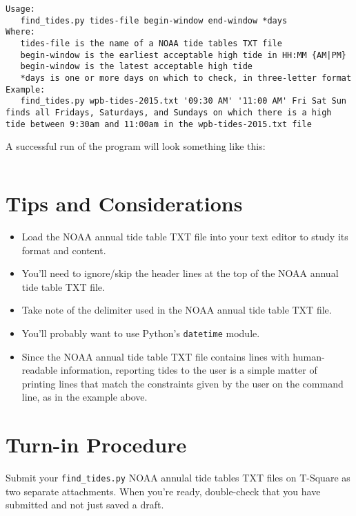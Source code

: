 \documentclass[12pt]{article}
\begin{document}
\begin{lstlisting}
Usage:
   find_tides.py tides-file begin-window end-window *days
Where:
   tides-file is the name of a NOAA tide tables TXT file
   begin-window is the earliest acceptable high tide in HH:MM {AM|PM}
   begin-window is the latest acceptable high tide
   *days is one or more days on which to check, in three-letter format
Example:
   find_tides.py wpb-tides-2015.txt '09:30 AM' '11:00 AM' Fri Sat Sun
finds all Fridays, Saturdays, and Sundays on which there is a high
tide between 9:30am and 11:00am in the wpb-tides-2015.txt file
\end{lstlisting}

A successful run of the program will look something like this:

\begin{lstlisting}

\end{lstlisting}


\section{Tips and Considerations}

\begin{itemize}
  \itemsep0em
  \item Load the NOAA annual tide table TXT file into your text editor to study its format and content.
\item You'll need to ignore/skip the header lines at the top of the NOAA annual tide table TXT file.
\item Take note of the delimiter used in the NOAA annual tide table TXT file.
\item You'll probably want to use Python's {\tt datetime} module.
\item Since the NOAA annual tide table TXT file contains lines with human-readable information, reporting tides to the user is a simple matter of printing lines that match the constraints given by the user on the command line, as in the example above.
\end{itemize}

\section{Turn-in Procedure}

Submit your {\tt find_tides.py} NOAA annulal tide tables TXT files on T-Square as two separate attachments.  When you're ready, double-check that you have submitted and not just saved a draft.
\end{document}
